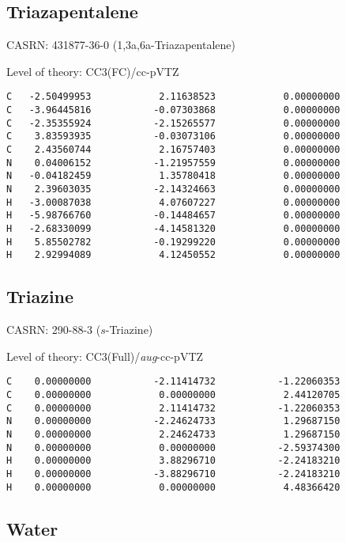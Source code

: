 \documentclass[journal=jctcce,manuscript=article,layout=traditional]{achemso}
\newcommand{\TZ}{cc-pVTZ}
\newcommand{\AVTZ}{\emph{aug}-cc-pVTZ}
\begin{document}
\subsection{Triazapentalene}

CASRN:  431877-36-0 (1,3a,6a-Triazapentalene)

\begin{singlespace}
\noindent Level of theory: CC3(FC)/{\TZ}
\begin{verbatim}
C   -2.50499953            2.11638523            0.00000000
C   -3.96445816           -0.07303868            0.00000000
C   -2.35355924           -2.15265577            0.00000000
C    3.83593935           -0.03073106            0.00000000
C    2.43560744            2.16757403            0.00000000
N    0.04006152           -1.21957559            0.00000000
N   -0.04182459            1.35780418            0.00000000
N    2.39603035           -2.14324663            0.00000000
H   -3.00087038            4.07607227            0.00000000
H   -5.98766760           -0.14484657            0.00000000
H   -2.68330099           -4.14581320            0.00000000
H    5.85502782           -0.19299220            0.00000000
H    2.92994089            4.12450552            0.00000000
\end{verbatim}
\end{singlespace}

\subsection{Triazine}

CASRN:  290-88-3 ($s$-Triazine)

\begin{singlespace}
\noindent Level of theory: CC3(Full)/{\AVTZ}
\begin{verbatim}
C    0.00000000           -2.11414732           -1.22060353
C    0.00000000            0.00000000            2.44120705
C    0.00000000            2.11414732           -1.22060353
N    0.00000000           -2.24624733            1.29687150
N    0.00000000            2.24624733            1.29687150
N    0.00000000            0.00000000           -2.59374300
H    0.00000000            3.88296710           -2.24183210
H    0.00000000           -3.88296710           -2.24183210
H    0.00000000            0.00000000            4.48366420
\end{verbatim}
\end{singlespace}

\subsection{Water}
\end{document}
